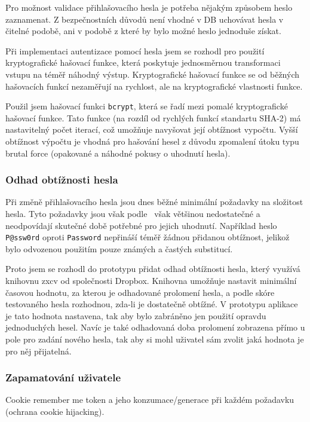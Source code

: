 Pro možnost validace přihlašovacího hesla je potřeba nějakým způsobem heslo zaznamenat.
Z bezpečnostních důvodů není vhodné v DB uchovávat hesla v čitelné podobě, ani v podobě z které by bylo možné heslo jednoduše získat.

Při implementaci autentizace pomocí hesla jsem se rozhodl pro použití kryptografické hašovací funkce, která poskytuje jednosměrnou transformaci vstupu na téměř náhodný výstup.
Kryptografické hašovací funkce se od běžných hašovacích funkcí nezaměřují na rychlost, ale na kryptografické vlastnosti funkce.

Použil jsem hašovací funkci \texttt{bcrypt}, která se řadí mezi pomalé kryptografické hašovací funkce.
Tato funkce (na rozdíl od rychlých funkcí standartu SHA-2) má nastavitelný počet iterací, což umožňuje navyšovat její obtížnost vypočtu.
Vyšší obtížnost výpočtu je vhodná pro hašování hesel z důvodu zpomalení útoku typu brutal force (opakované a náhodné pokusy o uhodnutí hesla).

\subsubsection{Odhad obtížnosti hesla}

Při změně přihlašovacího hesla jsou dnes běžné minimální požadavky na složitost hesla.
Tyto požadavky jsou však podle~\cite{dropbox:zxcv} však většinou nedostatečné a neodpovídají skutečné době potřebné pro jejich uhodnutí.
Například heslo \texttt{P@ssw0rd} oproti \texttt{Password} nepřináší téměř žádnou přidanou obtížnost, jelikož bylo odvozenou použitím pouze známých a častých substitucí.

Proto jsem se rozhodl do prototypu přidat odhad obtížnosti hesla, který využívá knihovnu zxcv od společnosti Dropbox.
Knihovna umožňuje nastavit minimální časovou hodnotu, za kterou je odhadované prolomení hesla, a podle skóre testovaného hesla rozhodnou, zda-li je dostatečně obtížné.
V prototypu aplikace je tato hodnota nastavena, tak aby bylo zabráněno jen použití opravdu jednoduchých hesel.
Navíc je také odhadovaná doba prolomení zobrazena přímo u pole pro zadání nového hesla, tak aby si mohl uživatel sám zvolit jaká hodnota je pro něj přijatelná.

\subsubsection{Zapamatování uživatele}

Cookie remember me token a jeho konzumace/generace při každém požadavku (ochrana cookie hijacking).

